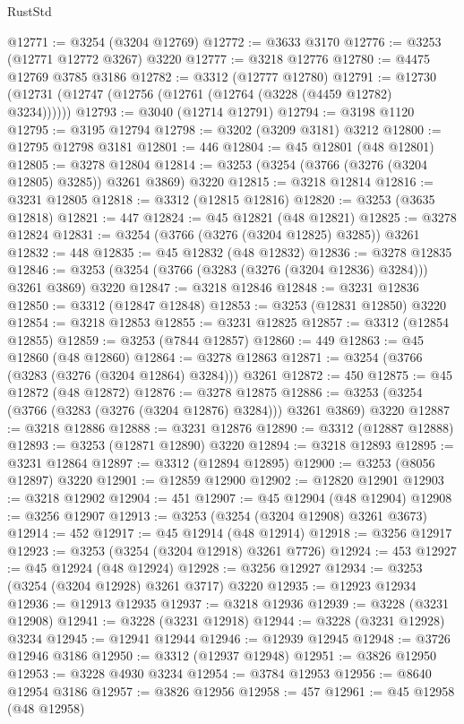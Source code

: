 \begin{lexlean}{RustStd}
\begin{coremodule}
@12771 := @3254 (@3204 @12769)
@12772 := @3633 @3170
@12776 := @3253 (@12771 @12772 @3267) @3220
@12777 := @3218 @12776
@12780 := @4475 @12769 @3785 @3186
@12782 := @3312 (@12777 @12780)
@12791 := @12730 (@12731 (@12747 (@12756 (@12761 (@12764 (@3228 (@4459 @12782) @3234))))))
@12793 := @3040 (@12714 @12791)
@12794 := @3198 @1120
@12795 := @3195 @12794
@12798 := @3202 (@3209 @3181) @3212
@12800 := @12795 @12798 @3181
@12801 := 446
@12804 := @45 @12801 (@48 @12801)
@12805 := @3278 @12804
@12814 := @3253 (@3254 (@3766 (@3276 (@3204 @12805) @3285)) @3261 @3869) @3220
@12815 := @3218 @12814
@12816 := @3231 @12805
@12818 := @3312 (@12815 @12816)
@12820 := @3253 (@3635 @12818)
@12821 := 447
@12824 := @45 @12821 (@48 @12821)
@12825 := @3278 @12824
@12831 := @3254 (@3766 (@3276 (@3204 @12825) @3285)) @3261
@12832 := 448
@12835 := @45 @12832 (@48 @12832)
@12836 := @3278 @12835
@12846 := @3253 (@3254 (@3766 (@3283 (@3276 (@3204 @12836) @3284))) @3261 @3869) @3220
@12847 := @3218 @12846
@12848 := @3231 @12836
@12850 := @3312 (@12847 @12848)
@12853 := @3253 (@12831 @12850) @3220
@12854 := @3218 @12853
@12855 := @3231 @12825
@12857 := @3312 (@12854 @12855)
@12859 := @3253 (@7844 @12857)
@12860 := 449
@12863 := @45 @12860 (@48 @12860)
@12864 := @3278 @12863
@12871 := @3254 (@3766 (@3283 (@3276 (@3204 @12864) @3284))) @3261
@12872 := 450
@12875 := @45 @12872 (@48 @12872)
@12876 := @3278 @12875
@12886 := @3253 (@3254 (@3766 (@3283 (@3276 (@3204 @12876) @3284))) @3261 @3869) @3220
@12887 := @3218 @12886
@12888 := @3231 @12876
@12890 := @3312 (@12887 @12888)
@12893 := @3253 (@12871 @12890) @3220
@12894 := @3218 @12893
@12895 := @3231 @12864
@12897 := @3312 (@12894 @12895)
@12900 := @3253 (@8056 @12897) @3220
@12901 := @12859 @12900
@12902 := @12820 @12901
@12903 := @3218 @12902
@12904 := 451
@12907 := @45 @12904 (@48 @12904)
@12908 := @3256 @12907
@12913 := @3253 (@3254 (@3204 @12908) @3261 @3673)
@12914 := 452
@12917 := @45 @12914 (@48 @12914)
@12918 := @3256 @12917
@12923 := @3253 (@3254 (@3204 @12918) @3261 @7726)
@12924 := 453
@12927 := @45 @12924 (@48 @12924)
@12928 := @3256 @12927
@12934 := @3253 (@3254 (@3204 @12928) @3261 @3717) @3220
@12935 := @12923 @12934
@12936 := @12913 @12935
@12937 := @3218 @12936
@12939 := @3228 (@3231 @12908)
@12941 := @3228 (@3231 @12918)
@12944 := @3228 (@3231 @12928) @3234
@12945 := @12941 @12944
@12946 := @12939 @12945
@12948 := @3726 @12946 @3186
@12950 := @3312 (@12937 @12948)
@12951 := @3826 @12950
@12953 := @3228 @4930 @3234
@12954 := @3784 @12953
@12956 := @8640 @12954 @3186
@12957 := @3826 @12956
@12958 := 457
@12961 := @45 @12958 (@48 @12958)

\end{coremodule}
\end{lexlean}
